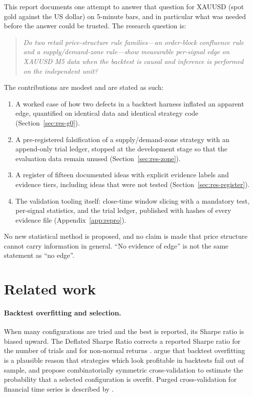 \documentclass[11pt,a4paper]{article}
\begin{document}
This report documents one attempt to answer that question for XAUUSD (spot gold against the US
dollar) on 5-minute bars, and in particular what was needed before the answer could be trusted.
The research question is:

\begin{quote}
\emph{Do two retail price-structure rule families---an order-block confluence rule and a
supply/demand-zone rule---show measurable per-signal edge on XAUUSD M5 data when the backtest is
causal and inference is performed on the independent unit?}
\end{quote}

The contributions are modest and are stated as such:
\begin{enumerate}
\item A worked case of how two defects in a backtest harness inflated an apparent edge,
quantified on identical data and identical strategy code (Section~\ref{sec:res-g0}).
\item A pre-registered falsification of a supply/demand-zone strategy with an append-only trial
ledger, stopped at the development stage so that the evaluation data remain unused
(Section~\ref{sec:res-zone}).
\item A register of fifteen documented ideas with explicit evidence labels and evidence tiers,
including ideas that were not tested (Section~\ref{sec:res-register}).
\item The validation tooling itself: close-time window slicing with a mandatory test,
per-signal statistics, and the trial ledger, published with hashes of every evidence file
(Appendix~\ref{app:repro}).
\end{enumerate}
No new statistical method is proposed, and no claim is made that price structure cannot carry
information in general. ``No evidence of edge'' is not the same statement as ``no edge''.

\section{Related work}

\paragraph{Backtest overfitting and selection.}
When many configurations are tried and the best is reported, its Sharpe ratio is biased upward.
The Deflated Sharpe Ratio corrects a reported Sharpe ratio for the number of trials and for
non-normal returns \citep{bailey2014dsr}. \citet{bailey2014pseudo} argue that backtest
overfitting is a plausible reason that strategies which look profitable in backtests fail out of
sample, and \citet{bailey2017pbo} propose combinatorially symmetric cross-validation to estimate
the probability that a selected configuration is overfit. Purged cross-validation for financial
time series is described by \citet{lopezdeprado2018afml}.
\end{document}
